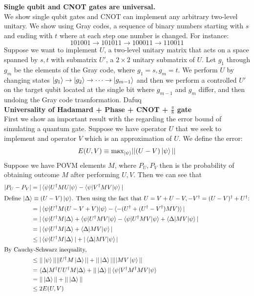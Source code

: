 \documentclass{article}
\begin{document}
\textbf{Single qubit and CNOT gates are universal.}\\
We show single qubit gates and CNOT can implement any arbitrary two-level unitary. We show using Gray codes, a sequence of binary numbers starting with $s$ and ending with $t$ where at each step one number is changed. For instance:
$$101001 \to 101011 \to  100011\to 110011$$
Suppose we want to implement $U$, a two-level unitary matrix that acts on a space spanned by $s,t$ with submatrix $U'$, a $2\times2$ unitary submatrix of $U$. Let $g_1$ through $g_m$ be the elements of the Gray code, where $g_1 = s, g_m = t$. We perform $U$ by changing states $\ket{g_1} \to \ket{g_2} \to \dots \to \ket{g_{m-1}}$ and then we perform a controlled $U'$ on the target qubit located at the single bit where $g_{m-1}$ and $g_m$ differ, and then undoing the Gray code trasnformation.
Dafuq
\\
\textbf{Universality of Hadamard + Phase + CNOT + $\frac{\pi}{8}$ gate}\\
First we show an important result with the regarding the error bound of simulating a quantum gate. Suppose we have operator $U$ that we seek to implement and operator $V$ which is an approximation of $U$. We define the error:
$$E(U,V) \equiv \text{max}_{\ket{\psi}} ||(U-V)\ket{\psi}||$$
Suppose we have POVM elements $M$, where $P_U, P_V$ then is the probability of obtaining outcome $M$ after performing $U,V$. Then we can see that
	\begin{align*}|P_U - P_V| &= |\braket{\psi|U^\dag M U |\psi} - \braket{\psi|V^\dag M V|\psi}|\\
		\intertext{Define $\ket{\Delta} \equiv (U-V)\ket{\psi}$. Then using the fact that $U= V + U -V, -V^\dag = (U-V)^\dag + U^\dag$:}
		&= |\braket{\psi |U^\dag M(U-V+ V)|\psi} - \braket{-(U^\dag + (U^\dag - V^\dag)MV)}|\\
		&= |\braket{\psi |U^\dag M| \Delta} + \braket{\psi|U^\dag M V|\psi} - \braket{\psi | U^\dag MV|\psi}+  \braket{\Delta|MV|\psi}|\\
		&= |\braket{\psi |U^\dag M| \Delta} +  \braket{\Delta|MV|\psi}|\\		& \leq |\braket{\psi |U^\dag M| \Delta}| + | \braket{\Delta|MV|\psi}|\\
		\intertext{By Cauchy-Schwarz inequality,}
		& \leq ||\ket{\psi}|| || U^\dag M \ket{\Delta}|| + ||\ket{\Delta}|| || MV \ket{\psi}||\\
		& = \braket{\Delta|M^\dag UU^\dag M|\Delta} + ||\ket{\Delta}||\braket{\psi|V^\dag M^\dag M V |\psi}\\
		& = ||\ket{\Delta}|| + ||\ket{\Delta}||\\
		&\leq 2E(U,V)
\end{align*}
\end{document}

